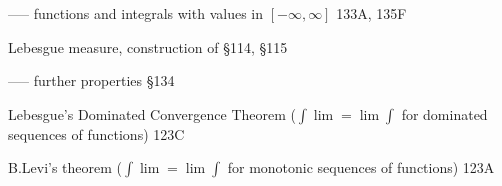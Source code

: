 ----- functions and integrals with values in $[-\infty,\infty]$ 133A, 135F




















































\indexmedskip













Lebesgue measure, construction of \S114, \S115

----- further properties \S134



Lebesgue's Dominated Convergence Theorem ($\int\lim=\lim\int$
for dominated sequences of functions) 123C

B.Levi's theorem ($\int\lim=\lim\int$
for monotonic sequences of functions) 123A













































